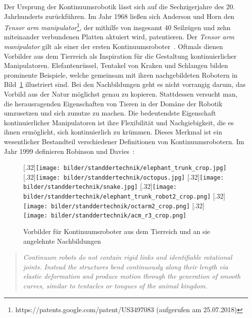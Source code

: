 Der Ursprung der Kontinuumsrobotik lässt sich auf die Sechzigerjahre des 20. Jahrhunderts zurückführen. Im Jahr 1968 ließen sich Anderson und Horn den \textit{Tensor arm manipulator}\footnote{https://patents.google.com/patent/US3497083 (aufgerufen am 25.07.2018)}, der mithilfe von insgesamt 40 Seilzügen und zehn miteinander verbundenen Platten aktuiert wird, patentieren. Der \textit{Tensor arm manipulator} gilt als einer der ersten Kontinuumsroboter~\cite{Wal13}. Oftmals dienen Vorbilder aus dem Tierreich als Inspiration für die Gestaltung kontinuierlicher Manipulatoren. Elefantenrüssel, Tentakel von Kraken und Schlangen bilden prominente Beispiele, welche gemeinsam mit ihren nachgebildeten Robotern in Bild~\ref{fig:tiere_roboter} illustriert sind. Bei den Nachbildungen geht es nicht vorrangig darum, das Vorbild aus der Natur möglichst genau zu kopieren. Stattdessen versucht man, die herausragenden Eigenschaften von Tieren in der Domäne der Robotik umzusetzen und sich zunutze zu machen. Die bedeutendste Eigenschaft kontinuierlicher Manipulatoren ist ihre Flexibilität und Nachgiebigkeit, die es ihnen ermöglicht, sich kontinuierlich zu krümmen. Dieses Merkmal ist ein wesentlicher Bestandteil verschiedener Definitionen von Kontinuumsrobotern. Im Jahr 1999 definieren Robinson und Davies~\cite{RD99}:

\begin{figure}[t!]
\centering
{}%
[.32\linewidth]{\texttt{[image: bilder/standdertechnik/elephant\_trunk\_crop.jpg]}}
%
[.32\linewidth]{\texttt{[image: bilder/standdertechnik/octopus.jpg]}}
[.32\linewidth]{\texttt{[image: bilder/standdertechnik/snake.jpg]}}
\medskip
{}%
[.32\linewidth]{\texttt{[image: bilder/standdertechnik/elephant\_trunk\_robot2\_crop.png]}}
%
[.32\linewidth]{\texttt{[image: bilder/standdertechnik/octarm2\_crop.png]}}
[.32\linewidth]{\texttt{[image: bilder/standdertechnik/acm\_r3\_crop.png]}}
\caption[Vorbilder für Kontinuumsroboter aus dem Tierreich und an sie angelehnte Nachbildungen]{Vorbilder für Kontinuumsroboter aus dem Tierreich und an sie angelehnte Nachbildungen}
\label{fig:tiere_roboter}
\end{figure}

\begin{quotation}
\textit{Continuum robots do not contain rigid links and identifiable rotational joints. Instead the structures bend continuously along their length via elastic deformation and produce motion through the generation of smooth curves, similar to tentacles or tongues of the animal kingdom.}
\end{quotation}

